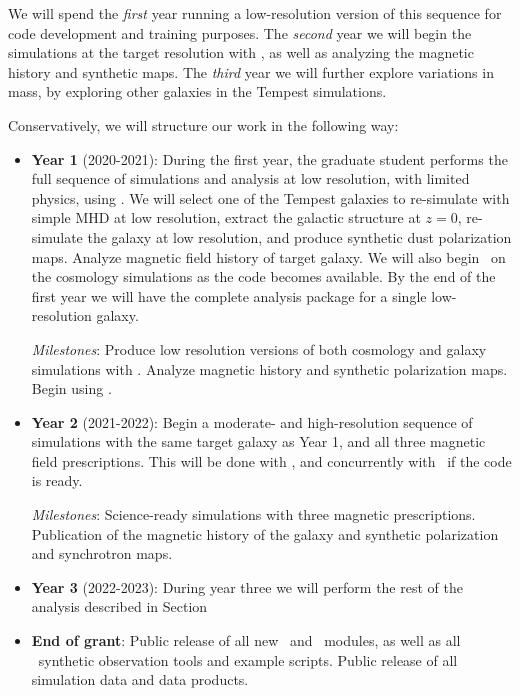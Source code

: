 We will spend the \emph{first} year running a low-resolution version of this sequence
for code development and training purposes.  The \emph{second} year we will begin the
simulations at the target resolution with \enzoe, as well as analyzing the
magnetic history and synthetic maps.  The \emph{third} year we will further explore
variations in mass, by exploring other galaxies in the Tempest simulations.

Conservatively, we will structure our work in the following way:
\begin{itemize}
\item{\textbf{Year 1} (2020-2021): 
    During the first year, the graduate student performs the full sequence of simulations and analysis
    at low resolution, with limited physics, using \enzo.  We will select one of the Tempest
    galaxies to re-simulate with simple MHD at low resolution, extract the
    galactic structure at $z=0$, re-simulate the galaxy at low resolution, and
    produce synthetic dust polarization maps.  Analyze magnetic field history of
    target galaxy.  We will also begin \enzoe\ on the cosmology simulations as
    the code becomes available.  By the end of the first year we will have the
    complete analysis package for a single low-resolution galaxy.  

{\em Milestones}: Produce low resolution versions of both cosmology and galaxy
simulations with \enzo.  Analyze magnetic history and synthetic polarization maps.  Begin using \enzoe.}

\item{\textbf{Year 2} (2021-2022): 
    Begin a moderate- and high-resolution sequence of simulations with the same target galaxy
    as Year 1, and all three magnetic field prescriptions.  This will be done
    with \enzo, and concurrently with \enzoe\ if the code is ready.  

{\em Milestones}: 
Science-ready simulations with three magnetic prescriptions. Publication of the
magnetic history of the galaxy and synthetic polarization and synchrotron maps.
}

\item{\textbf{Year 3} (2022-2023): 
    During year three we will perform the rest of the analysis described in 
    Section  
    }

\item{\textbf{End of grant}: Public release of all new \enzo\ and \enzoe\ modules,
as well as all \yt\ synthetic observation tools and example scripts.
Public release of all simulation data and data products.}

\end{itemize}

\vspace{-3mm}
